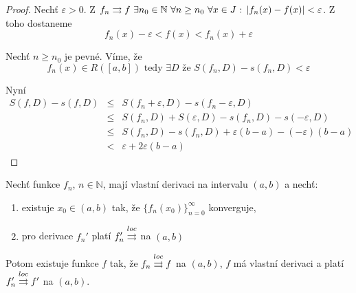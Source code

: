 \begin{proof}
Nechť $\varepsilon > 0$. Z $f_n \con f \ \exists n_0 \in \mathbb{N} \ \forall n \geq n_0 \ \forall x \in J \textrm{ : } |f_n(x) - f(x)| < \varepsilon$. Z toho dostaneme
$$f_n(x) - \varepsilon < f(x) < f_n(x) + \varepsilon$$

Nechť $n \geq n_0$ je pevné. Víme, že 
$$f_n(x) \in R([a,b]) \textrm{ tedy } \exists D \textrm{ že } S(f_n,D) - s(f_n,D) < \varepsilon$$

Nyní
\begin{eqnarray*}
S(f,D) - s(f,D) & \leq & S(f_n+\varepsilon, D) - s(f_n-\varepsilon,D) \\
& \leq & S(f_n,D)+S(\varepsilon,D) - s(f_n,D) - s(-\varepsilon,D) \\
& \leq & S(f_n,D) - s(f_n,D) +\varepsilon(b-a) - (-\varepsilon)(b-a) \\
& < & \varepsilon +2\varepsilon(b-a)
\end{eqnarray*}
\end{proof}

\begin{vetat}
\label{o záměně limity a derivace}
Nechť funkce $f_n$, $n \in \mathbb{N}$, mají vlastní derivaci na intervalu $(a,b)$ a nechť:
\begin{enumerate}
\item existuje $x_0 \in (a,b)$ tak, že $\{f_n(x_0)\}_{n=0}^{\infty}$ konverguje,
\item pro derivace $f_n'$ platí $f_n' \overset{loc}{\rightrightarrows}$ na $(a,b)$
\end{enumerate}
Potom existuje funkce $f$ tak, že $f_n \overset{loc}{\rightrightarrows} f$ na $(a,b)$, $f$ má vlastní derivaci a platí $f_n' \overset{loc}{\rightrightarrows} f'$ na $(a,b)$.
\end{vetat}

